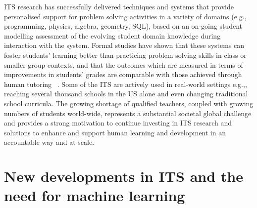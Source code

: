 \documentclass{article}
\begin{document}
ITS research has successfully delivered techniques and systems that provide personalised support for problem solving activities in a variety of domains (e.g., programming, physics, algebra, geometry, SQL), based on an on-going student modelling assessment of the evolving student domain knowledge during interaction with the system. Formal studies have shown that these systems can foster students' learning better than practicing problem solving skills in class or smaller group contexts, and that the outcomes which are measured in terms of improvements in students' grades are comparable with those achieved through human tutoring ~\cite{Schroeder2013,Nesbit2014,Boulay2016,review_intelligent_2014}.  Some of the ITS are actively used in real-world settings e.g.,\cite{Mitrovic2007,Koedinger2016}, reaching several thousand schools in the US alone and even changing traditional school curricula. The growing shortage of qualified teachers, coupled with growing numbers of students world-wide, represents a substantial societal global challenge and provides a strong motivation to continue investing in ITS research and solutions to enhance and support human learning and development in an accountable way and at scale.

\section{New developments in ITS and the need for machine learning}
\end{document}
